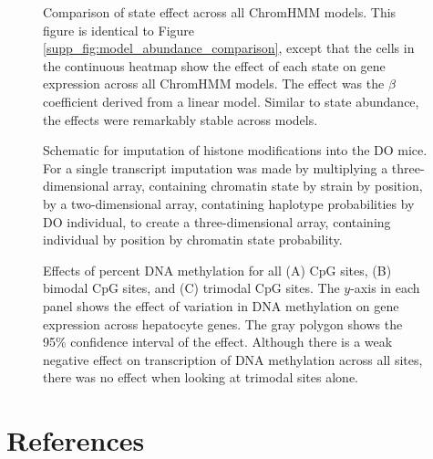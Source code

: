 \documentclass[10pt,letterpaper]{article}
\begin{document}
\begin{figure}[ht]
\centering
\caption{Comparison of state effect across all ChromHMM models. This figure is 
identical to Figure \ref{supp_fig:model_abundance_comparison}, except that the
cells in the continuous heatmap show the effect of each state on gene expression
across all ChromHMM models. The effect was the $\beta$ coefficient derived from
a linear model. Similar to state abundance, the effects were remarkably stable
across models.}
\label{supp_fig:model_effect_comparison}
\end{figure}

\begin{figure}[ht]
\centering
\caption{Schematic for imputation of histone modifications into the 
DO mice. For a single transcript imputation was made by multiplying 
a three-dimensional array, containing chromatin state by strain by
position, by a two-dimensional array, contatining haplotype probabilities
by DO individual, to create a three-dimensional array, containing 
individual by position by chromatin state probability.}
\label{supp_fig:imputation}
\end{figure}

\begin{figure}[ht]
\centering
\caption{Effects of percent DNA methylation for all (A) CpG sites,
(B) bimodal CpG sites, and (C) trimodal CpG sites. The $y$-axis
in each panel shows the effect of variation in DNA methylation on 
gene expression across hepatocyte genes. The gray polygon shows the
95\% confidence interval of the effect. Although there is a weak
negative effect on transcription of DNA methylation across all 
sites, there was no effect when looking at trimodal sites alone.}
\label{supp_fig:trimodal}
\end{figure}

\pagebreak

\hypertarget{references}{%
\section*{References}\label{references}}
\end{document}
